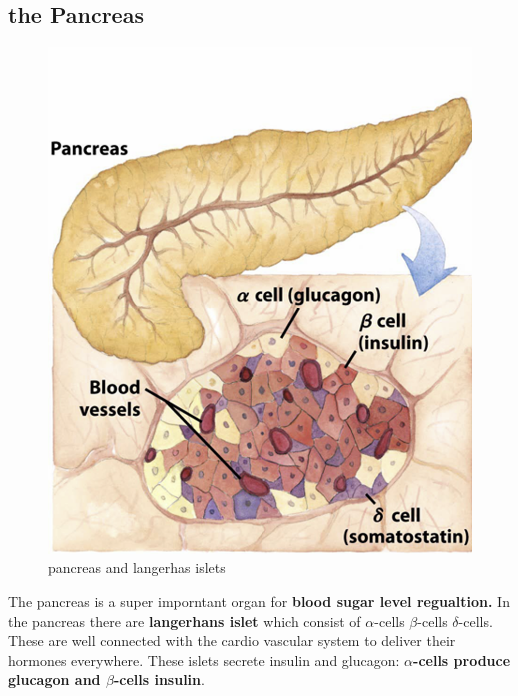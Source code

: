 \documentclass[../main.tex]{subfiles}
\begin{document}
\subsection{the Pancreas}
\begin{figure}[H]
    \centering
    \includegraphics[width=0.5\linewidth]{Sum_BC_II//lectures//bcll12/pancreas.png}
    \caption{pancreas and langerhas islets}
    \label{fig:enter-label}
\end{figure}
The pancreas is a super imporntant organ for\textbf{ blood sugar level regualtion.} In the pancreas there are \textbf{langerhans islet }which consist of $\alpha$-cells $\beta$-cells $\delta$-cells. These are well connected with the cardio vascular system to deliver their hormones everywhere. These islets secrete insulin and glucagon: \textbf{$\alpha$-cells  produce glucagon and $\beta$-cells insulin}.
\end{document}
